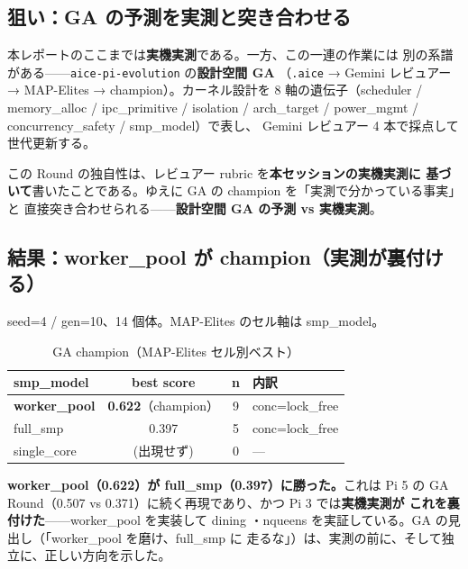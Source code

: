 
\subsection{狙い：GA の予測を実測と突き合わせる}

本レポートのここまでは\textbf{実機実測}である。一方、この一連の作業には
別の系譜がある——\texttt{aice-pi-evolution} の\textbf{設計空間 GA}
（\texttt{.aice} → Gemini レビュアー → MAP-Elites → champion）。カーネル設計を
8 軸の遺伝子（scheduler / memory\_alloc / ipc\_primitive / isolation /
arch\_target / power\_mgmt / concurrency\_safety / smp\_model）で表し、
Gemini レビュアー 4 本で採点して世代更新する。

この Round の独自性は、レビュアー rubric を\textbf{本セッションの実機実測に
基づいて}書いたことである。ゆえに GA の champion を「実測で分かっている事実」と
直接突き合わせられる——\textbf{設計空間 GA の予測 vs 実機実測}。

\subsection{結果：worker\_pool が champion（実測が裏付ける）}

seed=4 / gen=10、14 個体。MAP-Elites のセル軸は smp\_model。

\begin{table}[htbp]
\centering
\caption{GA champion（MAP-Elites セル別ベスト）}
\small
\begin{tabular}{@{}lccl@{}}
\toprule
smp\_model & best score & n & 内訳 \\
\midrule
\textbf{worker\_pool} & \textbf{0.622}（champion） & 9 & conc=lock\_free \\
full\_smp & 0.397 & 5 & conc=lock\_free \\
single\_core & (出現せず) & 0 & --- \\
\bottomrule
\end{tabular}
\end{table}

\noindent
\textbf{worker\_pool（0.622）が full\_smp（0.397）に勝った。}これは Pi 5 の
GA Round（0.507 vs 0.371）に続く再現であり、かつ Pi 3 では\textbf{実機実測が
これを裏付けた}——worker\_pool を実装して dining ・nqueens
 を実証している。GA の見出し（「worker\_pool を磨け、full\_smp に
走るな」）は、実測の前に、そして独立に、正しい方向を示した。

